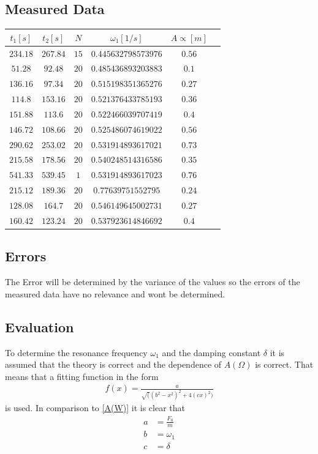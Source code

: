 \subsection{Measured Data}
\begin{center}
\begin{tabular}{c|c|c|c|c|c}
\(t_1 [s]\) & \(t_2 [s]\) & \(N\) & \(\omega_1 [1/s]\) & \(A \propto [m]\) \\\hline
\(234.18\) & \(267.84\) & \(15\) & \(0.445632798573976\) & \(0.56\) \\ 
\(51.28\) & \(92.48\) & \(20\) & \(0.485436893203883\) & \(0.1\) \\ 
\(136.16\) & \(97.34\) & \(20\) & \(0.515198351365276\) & \(0.27\) \\ 
\(114.8\) & \(153.16\) & \(20\) & \(0.521376433785193\) & \(0.36\) \\ 
\(151.88\) & \(113.6\) & \(20\) & \(0.522466039707419\) & \(0.4\) \\ 
\(146.72\) & \(108.66\) & \(20\) & \(0.525486074619022\) & \(0.56\) \\ 
\(290.62\) & \(253.02\) & \(20\) & \(0.531914893617021\) & \(0.73\) \\ 
\(215.58\) & \(178.56\) & \(20\) & \(0.540248514316586\) & \(0.35\) \\ 
\(541.33\) & \(539.45\) & \(1\) & \(0.531914893617023\) & \(0.76\) \\ 
\(215.12\) & \(189.36\) & \(20\) & \(0.77639751552795\) & \(0.24\) \\ 
\(128.08\) & \(164.7\) & \(20\) & \(0.546149645002731\) & \(0.27\) \\ 
\(160.42\) & \(123.24\) & \(20\) & \(0.537923614846692\) & \(0.4\) \\
\end{tabular}
\end{center}

\subsection{Errors}
The Error will be determined by the variance of the values so the errors of the measured
data have no relevance and wont be determined.

\subsection{Evaluation}
To determine the resonance frequency \(\omega_1\) and the damping constant \(\delta\)
it is assumed that the theory is correct and the dependence of \(A(\Omega)\) is correct.
That means that a fitting function in the form 
\begin{align}
f(x)=\frac{a}{\sqrt((b^2-x^2)^2+4(cx)^2)}
\end{align}
is used. In comparison to \eqref{A(W)} it is clear that
\begin{align}
a &= \frac{F_0}{m} \\
b &= \omega_1 \\
c &= \delta
\end{align}


